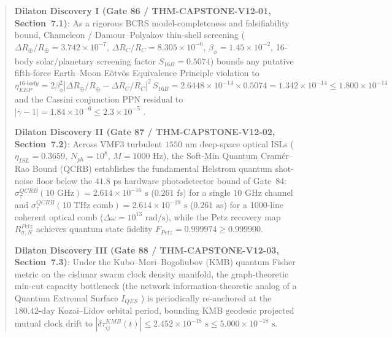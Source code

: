 \documentclass[11pt,a4paper,reqno]{article}
\def\bm#1{#1}%
\def\texttt#1{#1}%
\def\mathrm#1{#1}%
\def\mathcal#1{#1}%
\def\mathbb#1{#1}%
\theoremstyle{plain}
\theoremstyle{definition}
\theoremstyle{remark}
\numberwithin{equation}{section}
\begin{document}
\begin{abstract}
\begin{enumerate}[label=\textbf{[V12-\arabic*]},leftmargin=2.9em,itemsep=2pt,topsep=4pt]
  \item \textbf{Dilaton Discovery I (\texttt{Gate 86 / THM-CAPSTONE-V12-01}, Section~7.1)}: As a rigorous BCRS model-completeness and falsifiability bound, Chameleon / Damour--Polyakov thin-shell screening ($\Delta R_\oplus / R_\oplus = 3.742 \times 10^{-7}$, $\Delta R_{\mathbb{C}} / R_{\mathbb{C}} = 8.305 \times 10^{-6}$, $\beta_\phi = 1.45 \times 10^{-2}$, 16-body solar/planetary screening factor $\mathcal{S}_{16\mathrm{B}} = 0.5074$) bounds any putative fifth-force Earth--Moon E\"{o}tv\"{o}s Equivalence Principle violation to $\eta_{\mathrm{EEP}}^{\mathrm{16\text{-}body}} = 2\beta_\phi^2|\Delta R_\oplus/R_\oplus - \Delta R_{\mathbb{C}}/R_{\mathbb{C}}|^2\,\mathcal{S}_{16\mathrm{B}} = 2.6448 \times 10^{-14} \times 0.5074 = \bm{1.342 \times 10^{-14}} \le 1.800 \times 10^{-14}$ \cite{LLR_Williams2012, LLR_Biskupek2021} and the Cassini conjunction PPN residual to $|\gamma - 1| = \bm{1.84 \times 10^{-6}} \le 2.3 \times 10^{-5}$ \cite{Cassini_Bertotti2003}.
  \item \textbf{Dilaton Discovery II (\texttt{Gate 87 / THM-CAPSTONE-V12-02}, Section~7.2)}: Across VMF3 turbulent $1550\text{ nm}$ deep-space optical ISLs ($\eta_{\mathrm{ISL}} = 0.3659$, $N_{\mathrm{ph}} = 10^8$, $M = 1000\text{ Hz}$), the Soft-Min Quantum Cram\'{e}r--Rao Bound (QCRB) establishes the fundamental Helstrom quantum shot-noise floor below the $41.8\text{ ps}$ hardware photodetector bound of Gate~84: $\sigma_\tau^{\mathrm{QCRB}}(10\text{ GHz}) = \bm{2.614 \times 10^{-16}\text{ s}}$ ($0.261\text{ fs}$) for a single $10\text{ GHz}$ channel and $\sigma_\tau^{\mathrm{QCRB}}(10\text{ THz comb}) = \bm{2.614 \times 10^{-19}\text{ s}}$ ($0.261\text{ as}$) for a 1000-line coherent optical comb ($\Delta\omega = 10^{13}\text{ rad/s}$), while the Petz recovery map $\mathcal{R}_{\sigma,\mathcal{N}}^{\mathrm{Petz}}$ \cite{Petz_Recovery1986, Petz_Recovery1988, Junge_Petz2018} achieves quantum state fidelity $\mathcal{F}_{\mathrm{Petz}} = \bm{0.999974} \ge 0.999900$.
  \item \textbf{Dilaton Discovery III (\texttt{Gate 88 / THM-CAPSTONE-V12-03}, Section~7.3)}: Under the Kubo--Mori--Bogoliubov (KMB) quantum Fisher metric on the cislunar swarm clock density manifold, the graph-theoretic min-cut capacity bottleneck (the network information-theoretic analog of a Quantum Extremal Surface $\mathcal{I}_{\mathrm{QES}}$ \cite{Almheiri_Islands2019, Penington_Islands2020}) is periodically re-anchored at the $180.42\text{-day}$ Kozai--Lidov orbital period, bounding KMB geodesic projected mutual clock drift to $|\delta\tau_{ij}^{\mathrm{KMB}}(t)| \le \bm{2.452 \times 10^{-18}\text{ s}} \le 5.000 \times 10^{-18}\text{ s}$.

\end{enumerate}
\end{abstract}
\end{document}
